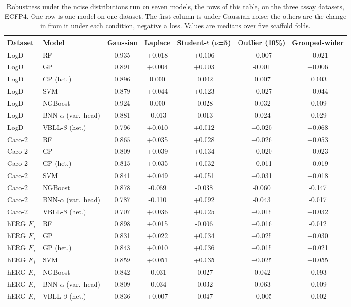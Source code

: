 \begin{table}[!htbp]
\centering
\small
\begin{adjustbox}{max width=\textwidth,max totalheight=0.78\textheight}
\begin{tabular}{llccccc}
\toprule
Dataset & Model & Gaussian & Laplace & Student-$t$ ($\nu$=5) & Outlier (10\%) & Grouped-wider \\
\midrule
LogD & RF & 0.935 & +0.018 & +0.006 & +0.007 & +0.021 \\
LogD & GP & 0.891 & +0.004 & +0.003 & -0.001 & +0.006 \\
LogD & GP (het.) & 0.896 & 0.000 & -0.002 & -0.007 & -0.003 \\
LogD & SVM & 0.879 & +0.044 & +0.023 & +0.027 & +0.044 \\
LogD & NGBoost & 0.924 & 0.000 & -0.028 & -0.032 & -0.009 \\
LogD & BNN-$\alpha$ (var.\ head) & 0.881 & -0.013 & -0.013 & -0.024 & -0.029 \\
LogD & VBLL-$\beta$ (het.) & 0.796 & +0.010 & +0.012 & +0.020 & +0.068 \\
Caco-2 & RF & 0.865 & +0.035 & +0.028 & +0.026 & +0.053 \\
Caco-2 & GP & 0.809 & +0.039 & +0.034 & +0.020 & +0.023 \\
Caco-2 & GP (het.) & 0.815 & +0.035 & +0.032 & +0.011 & +0.019 \\
Caco-2 & SVM & 0.841 & +0.049 & +0.051 & +0.031 & +0.018 \\
Caco-2 & NGBoost & 0.878 & -0.069 & -0.038 & -0.060 & -0.147 \\
Caco-2 & BNN-$\alpha$ (var.\ head) & 0.787 & -0.110 & +0.092 & -0.043 & -0.017 \\
Caco-2 & VBLL-$\beta$ (het.) & 0.707 & +0.036 & +0.025 & +0.015 & +0.032 \\
hERG $K_i$ & RF & 0.898 & +0.015 & -0.006 & +0.016 & -0.012 \\
hERG $K_i$ & GP & 0.831 & +0.022 & +0.034 & +0.025 & +0.030 \\
hERG $K_i$ & GP (het.) & 0.843 & +0.010 & +0.036 & +0.015 & +0.021 \\
hERG $K_i$ & SVM & 0.859 & +0.051 & +0.035 & +0.025 & +0.055 \\
hERG $K_i$ & NGBoost & 0.842 & -0.031 & -0.027 & -0.042 & -0.093 \\
hERG $K_i$ & BNN-$\alpha$ (var.\ head) & 0.809 & -0.034 & -0.032 & -0.063 & -0.009 \\
hERG $K_i$ & VBLL-$\beta$ (het.) & 0.836 & +0.007 & -0.047 & +0.005 & -0.002 \\
\bottomrule
\end{tabular}
\end{adjustbox}
\caption[Robustness under the noise distributions on the three assay datasets.]{Robustness under the noise distributions run on seven models, the rows of this table, on the three assay datasets, ECFP4. One row is one model on one dataset. The first column is \aucnorm{} under Gaussian noise; the others are the change in \aucnorm{} from it under each condition, negative a loss. Values are medians over five scaffold folds.}
\label{tab:assay_shape}
\end{table}

